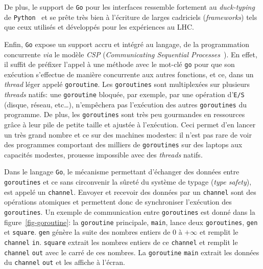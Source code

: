 \documentclass[a4paper,french]{article}
\begin{document}
De plus, le support de \texttt{Go} pour les interfaces ressemble fortement au
\emph{duck-typing} de \texttt{Python}~\cite{ref-python} et se pr\^ete tr\`es
bien \`a l'\'ecriture de larges cadriciels (\emph{frameworks}) tels que ceux
utilis\'es et d\'evelopp\'es pour les exp\'eriences au LHC.

Enfin, \texttt{Go} expose un support accru et int\'egr\'e au langage, de la
programmation concurrente \emph{via} le mod\`ele \emph{CSP} (\emph{Communicating
Sequential Processes}~\cite{ref-csp}).
En effet, il suffit de pr\'efixer l'appel \`a une m\'ethode avec le mot-cl\'e
\texttt{go} pour que son ex\'ecution s'effectue de mani\`ere concurrente aux
autres fonctions, et ce, dans un \emph{thread} l\'eger appel\'e
\texttt{goroutine}.
Les \texttt{goroutines} sont multiplex\'ees sur plusieurs \emph{threads} natifs:
une \texttt{goroutine} bloqu\'ee, par exemple, par une op\'eration d'\texttt{E/S}
(disque, r\'eseau, etc\ldots), n'emp\^echera pas l'ex\'ecution des autres
\texttt{goroutines} du programme.
De plus, les \texttt{goroutines} sont tr\`es peu gourmandes en ressources
gr\^ace \`a leur pile de petite taille et ajust\'ee \`a l'ex\'ecution.
Ceci permet d'en lancer un tr\`es grand nombre et ce sur des machines modestes:
il n'est pas rare de voir des programmes comportant des milliers de
\texttt{goroutines} sur des laptops aux capacit\'es modestes, prouesse
impossible avec des \emph{threads} natifs.

Dans le langage \texttt{Go}, le m\'ecanisme permettant d'\'echanger des
donn\'ees entre \texttt{goroutines} et ce sans circonvenir la s\^uret\'e du
syst\`eme de typage (\emph{type safety}), est appel\'e un \texttt{channel}.
Envoyer et recevoir des donn\'ees par un \texttt{channel} sont des op\'erations
atomiques et permettent donc de synchroniser l'ex\'ecution des
\texttt{goroutines}.
Un exemple de communication entre \texttt{goroutines} est donn\'e dans la
figure~\ref{fig-goroutine}: la \texttt{goroutine} principale, \texttt{main},
lance deux \texttt{goroutines}, \texttt{gen} et \texttt{square}.
\texttt{gen} g\'en\`ere la suite des nombres entiers de $0$ \`a $+\infty$ et
remplit le \texttt{channel} \texttt{in}.
\texttt{square} extrait les nombres entiers de ce \texttt{channel} et remplit le
\texttt{channel} \texttt{out} avec le carr\'e de ces nombres.
La \texttt{goroutine} \texttt{main} extrait les donn\'ees du \texttt{channel}
\texttt{out} et les affiche \`a l'\'ecran.
\end{document}
